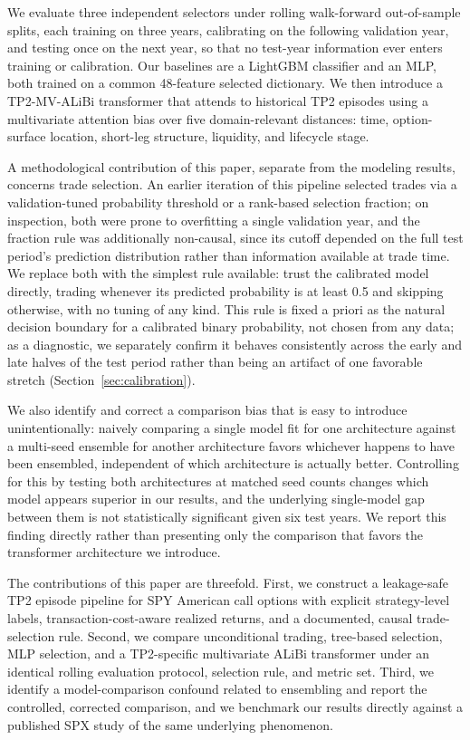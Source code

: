 \documentclass[sigconf,review,anonymous]{acmart}
\begin{document}
We evaluate three independent selectors under rolling walk-forward out-of-sample splits, each training on three years, calibrating on the following validation year, and testing once on the next year, so that no test-year information ever enters training or calibration. Our baselines are a LightGBM classifier and an MLP, both trained on a common 48-feature selected dictionary. We then introduce a TP2-MV-ALiBi transformer that attends to historical TP2 episodes using a multivariate attention bias over five domain-relevant distances: time, option-surface location, short-leg structure, liquidity, and lifecycle stage.

A methodological contribution of this paper, separate from the modeling results, concerns trade selection. An earlier iteration of this pipeline selected trades via a validation-tuned probability threshold or a rank-based selection fraction; on inspection, both were prone to overfitting a single validation year, and the fraction rule was additionally non-causal, since its cutoff depended on the full test period's prediction distribution rather than information available at trade time. We replace both with the simplest rule available: trust the calibrated model directly, trading whenever its predicted probability is at least 0.5 and skipping otherwise, with no tuning of any kind. This rule is fixed a priori as the natural decision boundary for a calibrated binary probability, not chosen from any data; as a diagnostic, we separately confirm it behaves consistently across the early and late halves of the test period rather than being an artifact of one favorable stretch (Section~\ref{sec:calibration}).

We also identify and correct a comparison bias that is easy to introduce unintentionally: naively comparing a single model fit for one architecture against a multi-seed ensemble for another architecture favors whichever happens to have been ensembled, independent of which architecture is actually better. Controlling for this by testing both architectures at matched seed counts changes which model appears superior in our results, and the underlying single-model gap between them is not statistically significant given six test years. We report this finding directly rather than presenting only the comparison that favors the transformer architecture we introduce.

The contributions of this paper are threefold. First, we construct a leakage-safe TP2 episode pipeline for SPY American call options with explicit strategy-level labels, transaction-cost-aware realized returns, and a documented, causal trade-selection rule. Second, we compare unconditional trading, tree-based selection, MLP selection, and a TP2-specific multivariate ALiBi transformer under an identical rolling evaluation protocol, selection rule, and metric set. Third, we identify a model-comparison confound related to ensembling and report the controlled, corrected comparison, and we benchmark our results directly against a published SPX study of the same underlying phenomenon.
\end{document}
